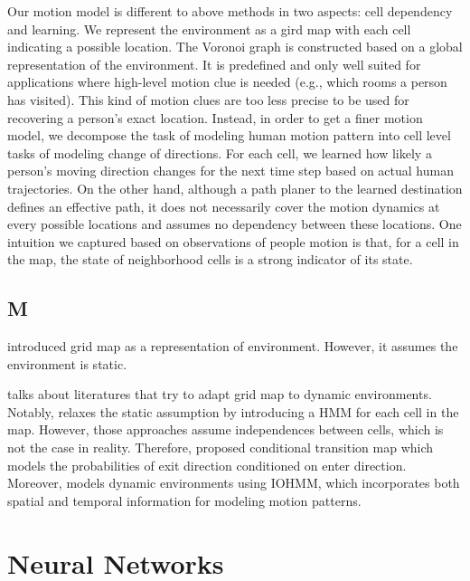 Our motion model is different to above methods in two aspects: cell dependency and learning. We represent the environment as a gird map with each cell indicating a possible location. The Voronoi graph is constructed based on a global representation of the environment. It is predefined and only well suited for applications where high-level motion clue is needed (e.g., which rooms a person has visited). This kind of motion clues are too less precise to be used for recovering a person's exact location. Instead, in order to get a finer motion model, we decompose the task of modeling human motion pattern into cell level tasks of modeling change of directions. For each cell, we learned how likely a person's moving direction changes for the next time step based on actual human trajectories. On the other hand, although a path planer to the learned destination defines an effective path, it does not necessarily cover the motion dynamics at every possible locations and assumes no dependency between these locations. One intuition we captured based on observations of people motion is that, for a cell in the map, the state of neighborhood cells is a strong indicator of its state.

\subsection{M}

\cite{moravec1985high} introduced grid map as a representation of environment. However, it assumes the environment is static.

\cite{kucner2013conditional} talks about literatures that try to adapt grid map to dynamic environments. Notably, \cite{meyer2012occupancy} relaxes the static assumption by introducing a HMM for each cell in the map. However, those approaches assume independences between cells, which is not the case in reality. Therefore, \cite{kucner2013conditional} proposed conditional transition map which models the probabilities of exit direction conditioned on enter direction. Moreover, \cite{wang2014modeling} models dynamic environments using IOHMM, which incorporates both spatial and temporal information for modeling motion patterns.

\section{Neural Networks}

